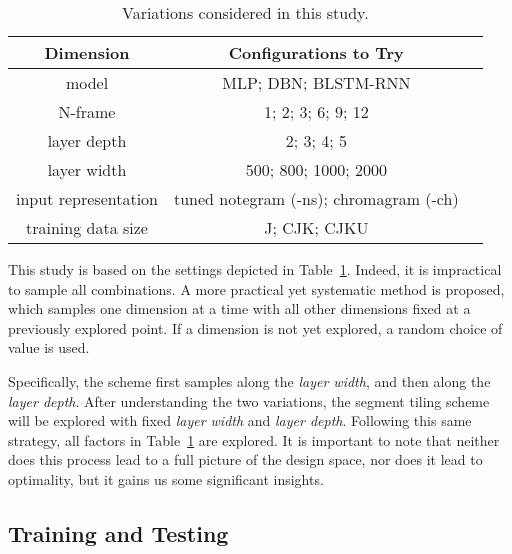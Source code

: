 \begin{table}
\caption{Variations considered in this study.}
\centering
\footnotesize
\begin{tabular}{|c|c|c|} \hline
Dimension & Configurations to Try \\ \hline
model & MLP; DBN; BLSTM-RNN \\ \hline
N-frame & 1; 2; 3; 6; 9; 12 \\ \hline
layer depth & 2; 3; 4; 5 \\ \hline
layer width & 500; 800; 1000; 2000 \\ \hline
input representation & tuned notegram (-ns); chromagram (-ch) \\ \hline
training data size & J; CJK; CJKU \\ \hline
\end{tabular}
\label{tab:3-varexplore}
\end{table}

This study is based on the settings depicted in Table~\ref{tab:3-varexplore}. Indeed, it is impractical to sample all combinations. A more practical yet systematic method is proposed, which samples one dimension at a time with all other dimensions fixed at a previously explored point. If a dimension is not yet explored, a random choice of value is used.

Specifically, the scheme first samples along the {\it layer width}, and then along the {\it layer depth}. After understanding the two variations, the segment tiling scheme will be explored with fixed {\it layer width} and {\it layer depth}. Following this same strategy, all factors in Table~\ref{tab:3-varexplore} are explored. It is important to note that neither does this process lead to a full picture of the design space, nor does it lead to optimality, but it gains us some significant insights.


\subsection{Training and Testing} \label{sec:3-traintest}

